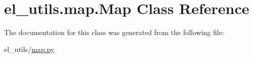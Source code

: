 \hypertarget{classel__utils_1_1map_1_1Map}{\section{el\-\_\-utils.\-map.\-Map Class Reference}
\label{classel__utils_1_1map_1_1Map}
}


The documentation for this class was generated from the following file\-:\begin{DoxyCompactItemize}
\item 
el\-\_\-utils/\hyperlink{map_8py}{map.\-py}\end{DoxyCompactItemize}
